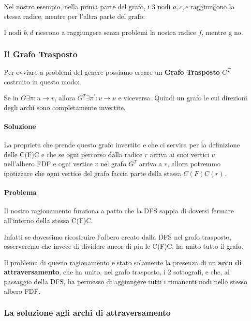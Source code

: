 
Nel nostro esempio, nella prima parte del grafo, i 3 nodi $a,c,e$ raggiungono la stessa radice, mentre per l'altra parte del grafo:

I nodi $b,d$ riescono a raggiungere senza problemi la nostra radice $f$, mentre g no.

\subsubsection{Il Grafo Trasposto}

Per ovviare a problemi del genere possiamo creare un \textbf{Grafo Trasposto} $G^{T}$ costruito in questo modo:\medskip

Se in $G \exists \pi: u \rightarrow v $, allora $G^{T} \exists \pi^{\prime}: v \rightarrow u$ e viceversa. Quindi un grafo le cui direzioni degli archi sono completamente invertite.


\paragraph{Soluzione}	La proprieta che prende questo grafo invertito e che ci servira per la definizione delle C(F)C e che se ogni percorso dalla radice $r$ arriva ai suoi vertici $v$ nell'albero FDF e ogni vertice $v$ nel grafo $G^{T}$ arriva a $r$, allora potremmo ipotizzare che ogni vertice del grafo faccia parte della stessa $C(F)C(r)$. 



\paragraph{Problema}
	Il nostro ragionamento funziona a patto che la DFS sappia di doversi fermare all'interno della stessa C(F)C.

Infatti se dovessimo ricostruire l'albero creato dalla DFS nel grafo trasposto, osserveremo che invece di dividere ancor di piu le C(F)C, ha unito tutto il grafo.


Il problema di questo ragionamento e stato solamente la presenza di un \textbf{arco di attraversamento}, che ha unito, nel grafo trasposto, i 2 sottografi, e che, al passaggio della DFS, ha permesso di aggiungere tutti i rimanenti nodi nello stesso albero FDF.

\subsubsection{La soluzione agli archi di attraversamento}

